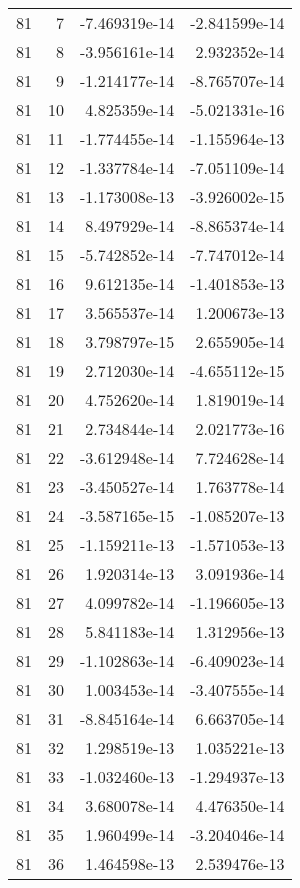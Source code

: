 \begin{tabular}{rrrr}
  81 &    7 & -7.469319e-14 & -2.841599e-14 \\
  81 &    8 & -3.956161e-14 &  2.932352e-14 \\
  81 &    9 & -1.214177e-14 & -8.765707e-14 \\
  81 &   10 &  4.825359e-14 & -5.021331e-16 \\
  81 &   11 & -1.774455e-14 & -1.155964e-13 \\
  81 &   12 & -1.337784e-14 & -7.051109e-14 \\
  81 &   13 & -1.173008e-13 & -3.926002e-15 \\
  81 &   14 &  8.497929e-14 & -8.865374e-14 \\
  81 &   15 & -5.742852e-14 & -7.747012e-14 \\
  81 &   16 &  9.612135e-14 & -1.401853e-13 \\
  81 &   17 &  3.565537e-14 &  1.200673e-13 \\
  81 &   18 &  3.798797e-15 &  2.655905e-14 \\
  81 &   19 &  2.712030e-14 & -4.655112e-15 \\
  81 &   20 &  4.752620e-14 &  1.819019e-14 \\
  81 &   21 &  2.734844e-14 &  2.021773e-16 \\
  81 &   22 & -3.612948e-14 &  7.724628e-14 \\
  81 &   23 & -3.450527e-14 &  1.763778e-14 \\
  81 &   24 & -3.587165e-15 & -1.085207e-13 \\
  81 &   25 & -1.159211e-13 & -1.571053e-13 \\
  81 &   26 &  1.920314e-13 &  3.091936e-14 \\
  81 &   27 &  4.099782e-14 & -1.196605e-13 \\
  81 &   28 &  5.841183e-14 &  1.312956e-13 \\
  81 &   29 & -1.102863e-14 & -6.409023e-14 \\
  81 &   30 &  1.003453e-14 & -3.407555e-14 \\
  81 &   31 & -8.845164e-14 &  6.663705e-14 \\
  81 &   32 &  1.298519e-13 &  1.035221e-13 \\
  81 &   33 & -1.032460e-13 & -1.294937e-13 \\
  81 &   34 &  3.680078e-14 &  4.476350e-14 \\
  81 &   35 &  1.960499e-14 & -3.204046e-14 \\
  81 &   36 &  1.464598e-13 &  2.539476e-13 \\

\end{tabular}
